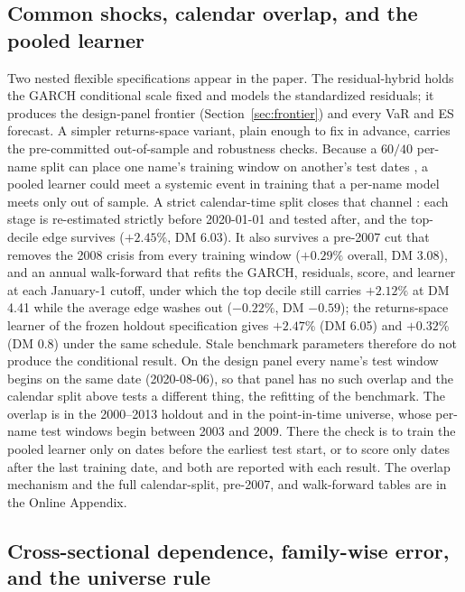 \documentclass[11pt]{article}
\theoremstyle{remark}
\begin{document}
\subsection{Common shocks, calendar overlap, and the pooled learner}
\label{sec:calendarleak}

Two nested flexible specifications appear in the paper. The
residual-hybrid holds the GARCH conditional scale fixed and models the
standardized residuals; it produces the design-panel frontier
(Section~\ref{sec:frontier}) and every VaR and ES forecast. A simpler
returns-space variant, plain enough to fix in advance, carries the
pre-committed out-of-sample and robustness checks. Because a $60/40$
per-name split can place one name's training window on another's test
dates \citep{lopezdeprado2018}, a pooled learner could meet a systemic
event in training that a per-name model meets only out of sample. A
strict calendar-time split closes that channel \citep{gukellyxiu2020}:
each stage is re-estimated strictly before 2020-01-01 and tested after,
and the top-decile edge survives ($+2.45\%$, DM 6.03). It also survives a
pre-2007 cut that removes the 2008 crisis from every training window
($+0.29\%$ overall, DM 3.08), and an annual walk-forward that refits the
GARCH, residuals, score, and learner at each January-1 cutoff, under
which the top decile still carries $+2.12\%$ at DM 4.41 while the average
edge washes out ($-0.22\%$, DM $-0.59$); the returns-space learner of the frozen holdout specification gives $+2.47\%$ (DM 6.05) and $+0.32\%$ (DM 0.8) under the same schedule. Stale benchmark parameters therefore do not
produce the conditional result. On the design panel every name's test window begins on the same date (2020-08-06), so that panel has no such overlap and the calendar split above tests a different thing, the refitting of the benchmark. The overlap is in the 2000--2013 holdout and in the point-in-time universe, whose per-name test windows begin between 2003 and 2009. There the check is to train the pooled learner only on dates before the earliest test start, or to score only dates after the last training date, and both are reported with each result. The overlap mechanism and the full
calendar-split, pre-2007, and walk-forward tables are in the Online
Appendix.

\subsection{Cross-sectional dependence, family-wise error, and the
universe rule}
\label{sec:fwer}
\end{document}

